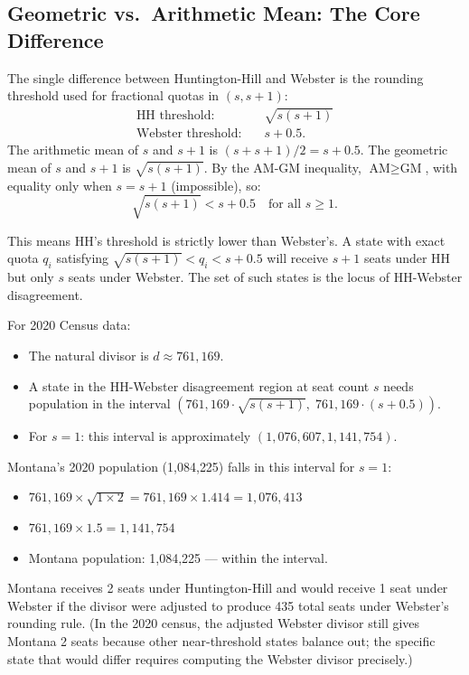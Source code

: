 \subsection{Geometric vs.\ Arithmetic Mean: The Core Difference}

The single difference between Huntington-Hill and Webster is the
rounding threshold used for fractional quotas in $(s, s+1)$:
\begin{align*}
\text{HH threshold:}      &\quad \sqrt{s(s+1)} \\
\text{Webster threshold:} &\quad s + 0.5.
\end{align*}
The arithmetic mean of $s$ and $s+1$ is $(s + s+1)/2 = s + 0.5$.
The geometric mean of $s$ and $s+1$ is $\sqrt{s(s+1)}$.
By the AM-GM inequality, $\text{AM} \geq \text{GM}$, with equality
only when $s = s+1$ (impossible), so:
\[
  \sqrt{s(s+1)} < s + 0.5 \quad \text{for all } s \geq 1.
\]

This means HH's threshold is strictly lower than Webster's.
A state with exact quota $q_i$ satisfying
$\sqrt{s(s+1)} < q_i < s + 0.5$
will receive $s+1$ seats under HH but only $s$ seats under Webster.
The set of such states is the locus of HH-Webster disagreement.

For 2020 Census data:
\begin{itemize}
  \item The natural divisor is $d \approx 761{,}169$.
  \item A state in the HH-Webster disagreement region at seat count $s$
    needs population in the interval
    $(761{,}169 \cdot \sqrt{s(s+1)},\; 761{,}169 \cdot (s+0.5))$.
  \item For $s = 1$: this interval is approximately $(1{,}076{,}607, 1{,}141{,}754)$.
\end{itemize}

Montana's 2020 population (1{,}084{,}225) falls in this interval for $s=1$:
\begin{itemize}
  \item $761{,}169 \times \sqrt{1 \times 2} = 761{,}169 \times 1.414 = 1{,}076{,}413$
  \item $761{,}169 \times 1.5 = 1{,}141{,}754$
  \item Montana population: 1{,}084{,}225 --- within the interval.
\end{itemize}
Montana receives 2 seats under Huntington-Hill and would receive 1 seat
under Webster if the divisor were adjusted to produce 435 total seats
under Webster's rounding rule.
(In the 2020 census, the adjusted Webster divisor still gives Montana 2 seats
because other near-threshold states balance out; the specific state that
would differ requires computing the Webster divisor precisely.)


